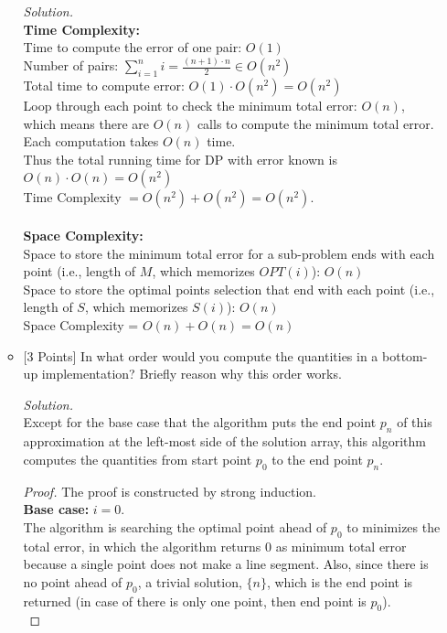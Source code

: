 \documentclass[10pt]{article}
\begin{document}
\begin{enumerate}
\begin{itemize}
        \begin{mdframed}
            \textit{Solution.}\\
            \textbf{Time Complexity:}\\
            Time to compute the error of one pair: $O(1)$\\
            Number of pairs: $\sum_{i = 1}^{n} i = \frac{(n + 1) \cdot n}{2} \in O(n^2)$\\
            Total time to compute error: $O(1) \cdot O(n^2) = O(n^2)$\\
            Loop through each point to check the minimum total error: $O(n)$, which means there are $O(n)$ calls to compute the minimum total error.\\
            Each computation takes $O(n)$ time.\\
            Thus the total running time for DP with error known is $O(n) \cdot O(n) = O(n^2)$\\
            Time Complexity $= O(n^2) + O(n^2) = O(n^2)$.\\
            \\
            \textbf{Space Complexity:}\\
            Space to store the minimum total error for a sub-problem ends with each point (i.e., length of $M$, which memorizes $OPT(i)$): $O(n)$\\
            Space to store the optimal points selection that end with each point (i.e., length of $S$, which memorizes $S(i)$): $O(n)$\\
            Space Complexity = $O(n) + O(n) = O(n)$
        \end{mdframed}
        \item {[3 Points]} In what order would you compute the quantities in a bottom-up implementation? Briefly reason why this order works.
        \begin{mdframed}
            \textit{Solution.}\\
            Except for the base case that the algorithm puts the end point $p_n$ of this approximation at the left-most side of the solution array, this algorithm computes the quantities from start point $p_0$ to the end point $p_n$.\\
            \begin{proof}
            The proof is constructed by strong induction.\\
            \textbf{Base case:} $i = 0$.\\ The algorithm is searching the optimal point ahead of $p_0$ to minimizes the total error, in which the algorithm returns 0 as minimum total error because a single point does not make a line segment. Also, since there is no point ahead of $p_0$, a trivial solution, $\{n\}$, which is the end point is returned (in case of there is only one point, then end point is $p_0$).\\

\end{proof}
\end{mdframed}
\end{itemize}
\end{enumerate}
\end{document}
